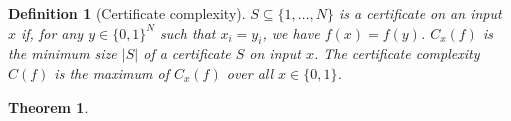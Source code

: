 \documentclass[12pt]{article}
\newtheorem{theorem}{Theorem}
\newtheorem{definition}{Definition}
\begin{document}
\begin{definition}[Certificate complexity] $S \subseteq \{1, \ldots, N\}$ is a certificate on an input $x$ if, for any $y \in \{0,1\}^N$ such that $x_i = y_i$, we have $f(x) = f(y)$. $C_x(f)$ is the minimum size $\lvert S \rvert$ of a certificate $S$ on input $x$. The certificate complexity $C(f)$ is the maximum of $C_x(f)$ over all $x\in \{0,1\}$.
\end{definition}

\begin{theorem}

\end{theorem}
\end{document}
